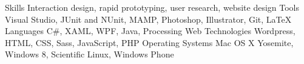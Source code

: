 




  \begin{cvskills}
    \cvskill
    {Skills}
    {Interaction design, rapid prototyping, user research, website design}
  \cvskill
    {Tools}
    {Visual Studio, JUnit and NUnit, MAMP, Photoshop, Illustrator, Git, LaTeX}
    \cvskill
      {Languages}
      {C\#, XAML, WPF, Java, Processing}
    \cvskill
    {Web Technologies}
    {Wordpress, HTML, CSS, Sass, JavaScript, PHP}
    \cvskill
    {Operating Systems}
    {Mac OS X Yosemite, Windows 8, Scientific Linux, Windows Phone}
  \end{cvskills}